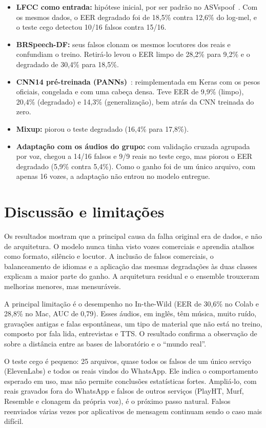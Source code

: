 \begin{itemize}
\item \textbf{LFCC como entrada:} hipótese inicial, por ser padrão no ASVspoof~\citep{sahidullah2015features}. Com os mesmos dados, o EER degradado foi de 18,5\% contra 12,6\% do log-mel, e o teste cego detectou 10/16 falsos contra 15/16.
\item \textbf{BRSpeech-DF:} seus falsos clonam os mesmos locutores dos reais e confundiam o treino. Retirá-lo levou o EER limpo de 28,2\% para 9,2\% e o degradado de 30,4\% para 18,5\%.
\item \textbf{CNN14 pré-treinada (PANNs)}~\citep{kong2020panns}: reimplementada em Keras com os pesos oficiais, congelada e com uma cabeça densa. Teve EER de 9,9\% (limpo), 20,4\% (degradado) e 14,3\% (generalização), bem atrás da CNN treinada do zero.
\item \textbf{Mixup:} piorou o teste degradado (16,4\% para 17,8\%).
\item \textbf{Adaptação com os áudios do grupo:} com validação cruzada agrupada por voz, chegou a 14/16 falsos e 9/9 reais no teste cego, mas piorou o EER degradado (5,9\% contra 5,4\%). Como o ganho foi de um único arquivo, com apenas 16 vozes, a adaptação não entrou no modelo entregue.
\end{itemize}


\section{Discussão e limitações}
\label{sec:discussao}

Os resultados mostram que a principal causa da falha original era de dados, e não de arquitetura. O modelo nunca tinha visto vozes comerciais e aprendia atalhos como formato, silêncio e locutor. A inclusão de falsos comerciais, o balanceamento de idiomas e a aplicação das mesmas degradações às duas classes explicam a maior parte do ganho. A arquitetura residual e o ensemble trouxeram melhorias menores, mas mensuráveis.

A principal limitação é o desempenho no In-the-Wild (EER de 30,6\% no Colab e 28,8\% no Mac, AUC de 0,79). Esses áudios, em inglês, têm música, muito ruído, gravações antigas e falas espontâneas, um tipo de material que não está no treino, composto por fala lida, entrevistas e TTS. O resultado confirma a observação de \citet{muller2022itw} sobre a distância entre as bases de laboratório e o ``mundo real''.

O teste cego é pequeno: 25 arquivos, quase todos os falsos de um único serviço (ElevenLabs) e todos os reais vindos do WhatsApp. Ele indica o comportamento esperado em uso, mas não permite conclusões estatísticas fortes. Ampliá-lo, com reais gravados fora do WhatsApp e falsos de outros serviços (PlayHT, Murf, Resemble e clonagem da própria voz), é o próximo passo natural. Falsos reenviados várias vezes por aplicativos de mensagem continuam sendo o caso mais difícil.

